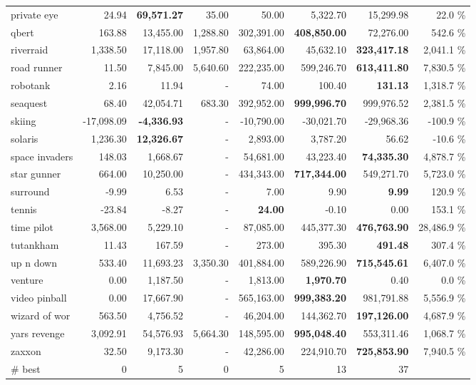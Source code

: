 \begin{center}
\begin{tabularx}{0.900000\textwidth}{X| r r r r r r r}
private eye &24.94 & \textbf{69,571.27} & 35.00 & 50.00 & 5,322.70 & 15,299.98 & 22.0 \%\\
qbert &163.88 & 13,455.00 & 1,288.80 & 302,391.00 & \textbf{408,850.00} & 72,276.00 & 542.6 \%\\
riverraid &1,338.50 & 17,118.00 & 1,957.80 & 63,864.00 & 45,632.10 & \textbf{323,417.18} & 2,041.1 \%\\
road runner &11.50 & 7,845.00 & 5,640.60 & 222,235.00 & 599,246.70 & \textbf{613,411.80} & 7,830.5 \%\\
robotank &2.16 & 11.94 & - & 74.00 & 100.40 & \textbf{131.13} & 1,318.7 \%\\
seaquest &68.40 & 42,054.71 & 683.30 & 392,952.00 & \textbf{999,996.70} & 999,976.52 & 2,381.5 \%\\
skiing &-17,098.09 & \textbf{-4,336.93} & - & -10,790.00 & -30,021.70 & -29,968.36 & -100.9 \%\\
solaris &1,236.30 & \textbf{12,326.67} & - & 2,893.00 & 3,787.20 & 56.62 & -10.6 \%\\
space invaders &148.03 & 1,668.67 & - & 54,681.00 & 43,223.40 & \textbf{74,335.30} & 4,878.7 \%\\
star gunner &664.00 & 10,250.00 & - & 434,343.00 & \textbf{717,344.00} & 549,271.70 & 5,723.0 \%\\
surround &-9.99 & 6.53 & - & 7.00 & 9.90 & \textbf{9.99} & 120.9 \%\\
tennis &-23.84 & -8.27 & - & \textbf{24.00} & -0.10 & 0.00 & 153.1 \%\\
time pilot &3,568.00 & 5,229.10 & - & 87,085.00 & 445,377.30 & \textbf{476,763.90} & 28,486.9 \%\\
tutankham &11.43 & 167.59 & - & 273.00 & 395.30 & \textbf{491.48} & 307.4 \%\\
up n down &533.40 & 11,693.23 & 3,350.30 & 401,884.00 & 589,226.90 & \textbf{715,545.61} & 6,407.0 \%\\
venture &0.00 & 1,187.50 & - & 1,813.00 & \textbf{1,970.70} & 0.40 & 0.0 \%\\
video pinball &0.00 & 17,667.90 & - & 565,163.00 & \textbf{999,383.20} & 981,791.88 & 5,556.9 \%\\
wizard of wor &563.50 & 4,756.52 & - & 46,204.00 & 144,362.70 & \textbf{197,126.00} & 4,687.9 \%\\
yars revenge &3,092.91 & 54,576.93 & 5,664.30 & 148,595.00 & \textbf{995,048.40} & 553,311.46 & 1,068.7 \%\\
zaxxon &32.50 & 9,173.30 & - & 42,286.00 & 224,910.70 & \textbf{725,853.90} & 7,940.5 \%\\
\midrule
\# best & 0 & 5 & 0 & 5 & 13 & 37\\
\bottomrule
\end{tabularx}
\end{center}
